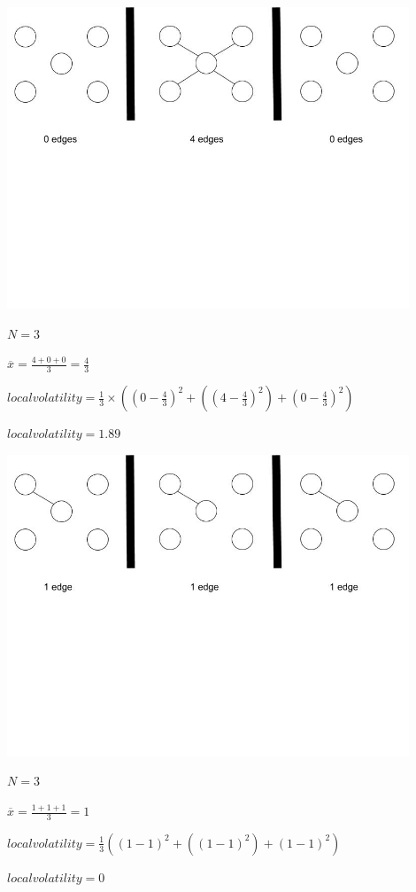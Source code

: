 \begin{center}
\includegraphics[trim={0 10cm 0 -1cm}, width=120mm]{./Figures/volatility1.jpg}

$N = 3$

$\overline{x} = \frac{4 + 0 + 0}{3} = \frac{4}{3}$

$local volatility =\frac{1}{3}\times((0 - \frac{4}{3})^2 + ((4 - \frac{4}{3})^2) + (0 - \frac{4}{3})^2) $

$local volatility = 1.89$

\includegraphics[trim={0 10cm 0 -1cm}, width=120mm]{./Figures/volatility2.jpg}

$N = 3$

$\overline{x} = \frac{1 + 1 + 1}{3} = 1$

$local volatility =\frac{1}{3}((1 - 1)^2 + ((1 - 1)^2) + (1 - 1)^2) $

$local volatility = 0$
\end{center}


